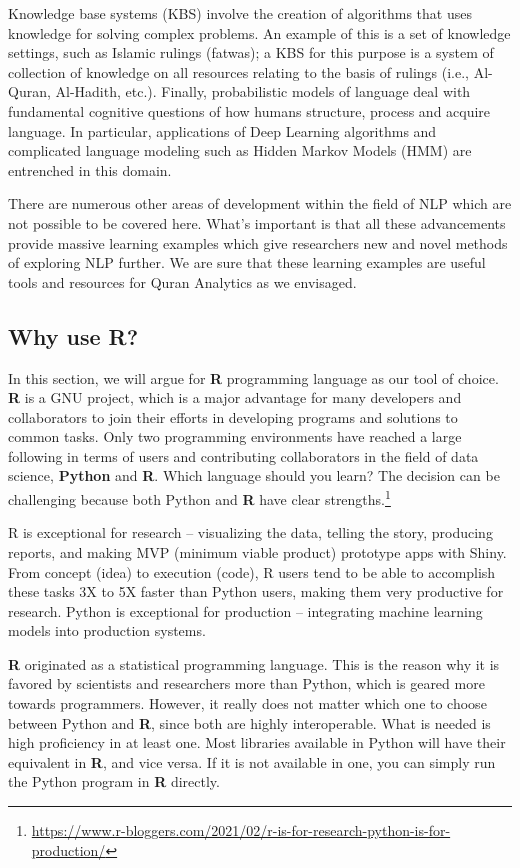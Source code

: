 \documentclass[
]{article}
\begin{document}
Knowledge base systems (KBS) involve the creation of algorithms that uses knowledge for solving complex problems. An example of this is a set of knowledge settings, such as Islamic rulings (fatwas); a KBS for this purpose is a system of collection of knowledge on all resources relating to the basis of rulings (i.e., Al-Quran, Al-Hadith, etc.). Finally, probabilistic models of language deal with fundamental cognitive questions of how humans structure, process and acquire language. In particular, applications of Deep Learning algorithms and complicated language modeling such as Hidden Markov Models (HMM) are entrenched in this domain.

There are numerous other areas of development within the field of NLP which are not possible to be covered here. What's important is that all these advancements provide massive learning examples which give researchers new and novel methods of exploring NLP further. We are sure that these learning examples are useful tools and resources for Quran Analytics as we envisaged.

\hypertarget{why-use-R}{%
\subsection{Why use R?}\label{why-use-R}}

In this section, we will argue for \textbf{R} programming language as our tool of choice. \textbf{R} is a GNU project, which is a major advantage for many developers and collaborators to join their efforts in developing programs and solutions to common tasks. Only two programming environments have reached a large following in terms of users and contributing collaborators in the field of data science, \textbf{Python} and \textbf{R}. Which language should you learn? The decision can be challenging because both Python and \textbf{R} have clear strengths.\footnote{\url{https://www.r-bloggers.com/2021/02/r-is-for-research-python-is-for-production/}}

R is exceptional for research -- visualizing the data, telling the story, producing reports, and making MVP (minimum viable product) prototype apps with Shiny. From concept (idea) to execution (code), R users tend to be able to accomplish these tasks 3X to 5X faster than Python users, making them very productive for research. Python is exceptional for production -- integrating machine learning models into production systems.

\textbf{R} originated as a statistical programming language. This is the reason why it is favored by scientists and researchers more than Python, which is geared more towards programmers. However, it really does not matter which one to choose between Python and \textbf{R}, since both are highly interoperable. What is needed is high proficiency in at least one. Most libraries available in Python will have their equivalent in \textbf{R}, and vice versa. If it is not available in one, you can simply run the Python program in \textbf{R} directly.
\end{document}

